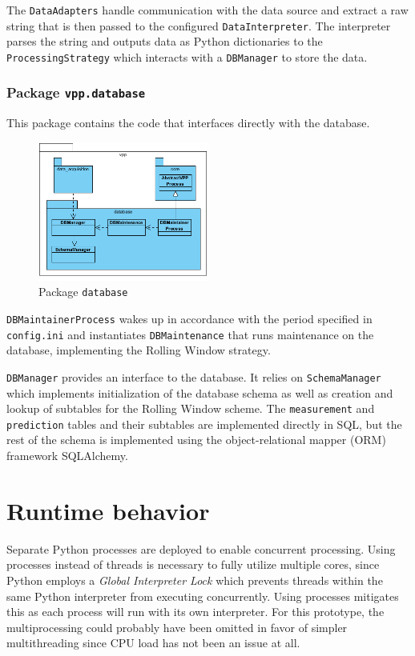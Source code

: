 The \texttt{DataAdapters} handle communication with the data source and extract a raw string that is then passed to the configured \texttt{DataInterpreter}. The interpreter parses the string and outputs data as Python dictionaries to the \texttt{ProcessingStrategy} which interacts with a \texttt{DBManager} to store the data.


\subsubsection{Package \texttt{vpp.database}}

This package contains the code that interfaces directly with the database. 

\begin{figure}[H]
	\centering
	\includegraphics[width=0.5\textwidth]{figures/class_db}
	\caption{Package \texttt{database}}
	\label{}
\end{figure}

\texttt{DBMaintainerProcess} wakes up in accordance with the period specified in \texttt{config.ini} and instantiates  \texttt{DBMaintenance} that runs maintenance on the database, implementing the Rolling Window strategy.

\texttt{DBManager} provides an interface to the database. It relies on \texttt{SchemaManager} which implements initialization of the database schema as well as creation and lookup of subtables for the Rolling Window scheme. The \texttt{measurement} and \texttt{prediction} tables and their subtables are implemented directly in SQL, but the rest of the schema is implemented using the object-relational mapper (ORM) framework SQLAlchemy.

\newpage
\section{Runtime behavior}

Separate Python processes are deployed to enable concurrent processing. Using processes instead of threads is necessary to fully utilize multiple cores, since Python employs a \emph{Global Interpreter Lock} which prevents threads within the same Python interpreter from executing concurrently. Using processes mitigates this as each process will run with its own interpreter. For this prototype, the multiprocessing could probably have been omitted in favor of simpler multithreading since CPU load has not been an issue at all.

